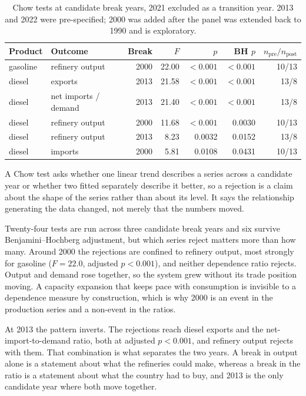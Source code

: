 \documentclass[11pt,a4paper]{article}
\begin{document}
\begin{table}[htbp]
\centering
\caption{Chow tests at candidate break years, 2021 excluded as a transition year. 2013 and 2022
were pre-specified; 2000 was added after the panel was extended back to 1990 and is exploratory.}
\label{tab:breaks}
\begin{tabular}{llrrrrr}
\toprule
Product & Outcome & Break & $F$ & $p$ & BH $p$ & $n_{\text{pre}}/n_{\text{post}}$ \\
\midrule
gasoline & refinery output & 2000 & 22.00 & $<0.001$ & $<0.001$ & 10/13 \\
diesel & exports & 2013 & 21.58 & $<0.001$ & $<0.001$ & 13/8 \\
diesel & net imports / demand & 2013 & 21.40 & $<0.001$ & $<0.001$ & 13/8 \\
diesel & refinery output & 2000 & 11.68 & $<0.001$ & 0.0030 & 10/13 \\
diesel & refinery output & 2013 & 8.23 & 0.0032 & 0.0152 & 13/8 \\
diesel & imports & 2000 & 5.81 & 0.0108 & 0.0431 & 10/13 \\
\bottomrule
\end{tabular}
\end{table}

A Chow test asks whether one linear trend describes a series across a candidate year or whether
two fitted separately describe it better, so a rejection is a claim about the shape of the
series rather than about its level. It says the relationship generating the data changed, not
merely that the numbers moved.

Twenty-four tests are run across three candidate break years and six survive
Benjamini--Hochberg adjustment, but which series reject matters more than how many. Around 2000
the rejections are confined to refinery output, most strongly for gasoline ($F=22.0$, adjusted
$p<0.001$), and neither dependence ratio rejects. Output and demand rose together, so the
system grew without its trade position moving. A capacity expansion that keeps pace with
consumption is invisible to a dependence measure by construction, which is why 2000 is an
event in the production series and a non-event in the ratios.

At 2013 the pattern inverts. The rejections reach diesel exports and the net-import-to-demand
ratio, both at adjusted $p<0.001$, and refinery output rejects with them. That combination is
what separates the two years. A break in output alone is a statement about what the refineries
could make, whereas a break in the ratio is a statement about what the country had to buy, and
2013 is the only candidate year where both move together.
\end{document}
